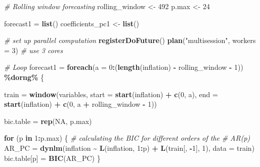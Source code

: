 \documentclass[
]{article}
\newenvironment{Shaded}{\begin{snugshade}}{\end{snugshade}}
\newcommand{\AttributeTok}[1]{\textcolor[rgb]{0.13,0.29,0.53}{#1}}
\newcommand{\CommentTok}[1]{\textcolor[rgb]{0.56,0.35,0.01}{\textit{#1}}}
\newcommand{\ConstantTok}[1]{\textcolor[rgb]{0.56,0.35,0.01}{#1}}
\newcommand{\ControlFlowTok}[1]{\textcolor[rgb]{0.13,0.29,0.53}{\textbf{#1}}}
\newcommand{\DecValTok}[1]{\textcolor[rgb]{0.00,0.00,0.81}{#1}}
\newcommand{\FunctionTok}[1]{\textcolor[rgb]{0.13,0.29,0.53}{\textbf{#1}}}
\newcommand{\NormalTok}[1]{#1}
\newcommand{\OtherTok}[1]{\textcolor[rgb]{0.56,0.35,0.01}{#1}}
\newcommand{\SpecialCharTok}[1]{\textcolor[rgb]{0.81,0.36,0.00}{\textbf{#1}}}
\newcommand{\StringTok}[1]{\textcolor[rgb]{0.31,0.60,0.02}{#1}}
\begin{document}
\begin{Shaded}
\begin{Highlighting}[]
\CommentTok{\# Rolling window forecasting}
\NormalTok{rolling\_window }\OtherTok{\textless{}{-}} \DecValTok{492}
\NormalTok{p.max }\OtherTok{\textless{}{-}} \DecValTok{24}

\NormalTok{forecast1 }\OtherTok{=} \FunctionTok{list}\NormalTok{()}
\NormalTok{coefficients\_pc1 }\OtherTok{\textless{}{-}} \FunctionTok{list}\NormalTok{()}

\CommentTok{\# set up parallel computation}
\FunctionTok{registerDoFuture}\NormalTok{()}
\FunctionTok{plan}\NormalTok{(}\StringTok{"multisession"}\NormalTok{, }\AttributeTok{workers =} \DecValTok{3}\NormalTok{)  }\CommentTok{\# use 3 cores }

\CommentTok{\# Loop}
\NormalTok{forecast1 }\OtherTok{=} \FunctionTok{foreach}\NormalTok{(}\AttributeTok{a =} \DecValTok{0}\SpecialCharTok{:}\NormalTok{(}\FunctionTok{length}\NormalTok{(inflation) }\SpecialCharTok{{-}}\NormalTok{ rolling\_window }\SpecialCharTok{{-}}
    \DecValTok{1}\NormalTok{)) }\SpecialCharTok{\%dorng\%}\NormalTok{ \{}

\NormalTok{    train }\OtherTok{=} \FunctionTok{window}\NormalTok{(variables, }\AttributeTok{start =} \FunctionTok{start}\NormalTok{(inflation) }\SpecialCharTok{+} \FunctionTok{c}\NormalTok{(}\DecValTok{0}\NormalTok{,}
\NormalTok{        a), }\AttributeTok{end =} \FunctionTok{start}\NormalTok{(inflation) }\SpecialCharTok{+} \FunctionTok{c}\NormalTok{(}\DecValTok{0}\NormalTok{, a }\SpecialCharTok{+}\NormalTok{ rolling\_window }\SpecialCharTok{{-}}
        \DecValTok{1}\NormalTok{))}

\NormalTok{    bic.table }\OtherTok{=} \FunctionTok{rep}\NormalTok{(}\ConstantTok{NA}\NormalTok{, p.max)}

    \ControlFlowTok{for}\NormalTok{ (p }\ControlFlowTok{in} \DecValTok{1}\SpecialCharTok{:}\NormalTok{p.max) \{}
        \CommentTok{\# calculating the BIC for different orders of the}
        \CommentTok{\# AR(p)}
\NormalTok{        AR\_PC }\OtherTok{=} \FunctionTok{dynlm}\NormalTok{(inflation }\SpecialCharTok{\textasciitilde{}} \FunctionTok{L}\NormalTok{(inflation, }\DecValTok{1}\SpecialCharTok{:}\NormalTok{p) }\SpecialCharTok{+} \FunctionTok{L}\NormalTok{(train[,}
            \SpecialCharTok{{-}}\DecValTok{1}\NormalTok{], }\DecValTok{1}\NormalTok{), }\AttributeTok{data =}\NormalTok{ train)}
\NormalTok{        bic.table[p] }\OtherTok{=} \FunctionTok{BIC}\NormalTok{(AR\_PC)}
\NormalTok{    \}}


\end{Highlighting}
\end{Shaded}
\end{document}
